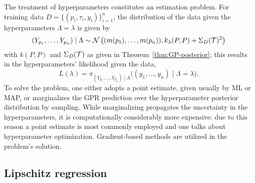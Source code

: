 The treatment of hyperparameters constitutes an estimation problem.
For training data $D =\{ (p_i, \tau_i, y_i) \}_{i=1}^n$, the distribution of the data given the hyperparameters $\Lambda = \lambda$ is given by
\[
    (Y_{p_1}, \dots, Y_{p_n}) \mid \Lambda \sim \mathcal N \left( (m(p_1), \dots, m(p_n)), k_\lambda(P,P) + \Sigma_D(\mathcal T)^2 \right)
\]
with $k(P,P)$ and $\Sigma_D(\mathcal T)$ as given in Theorem~\ref{thm:GP-posterior};
this results in the hyperparameters' likelihood given the data,
\[
    L(\lambda) = \pi_{(Y_{p_1}, \dots, Y_{p_n}) \mid \Lambda} \big ( (y_1,\dots,y_n) \mid \Lambda = \lambda \big ).
\]
To solve the problem, one either adopts a point estimate, given usually by ML or MAP, or marginalizes the GPR prediction over the hyperparameter posterior distribution by sampling. 
While marginalizing propagates the uncertainty in the hyperparameters, it is computationally considerably more expensive: due to this reason a point estimate is most commonly employed and one talks about hyperparameter optimization. Gradient-based methods are utilized in the problem's solution. \newline


\subsection{Lipschitz regression}\label{sec:LR}